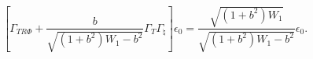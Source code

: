\begin{equation}
\label{susy2}
\left[\Gamma_{T R \Phi} + \frac{b}{\sqrt{(1 + b^2) W_1 - b^2}}
\Gamma_{T} \Gamma_{\natural} \right] \epsilon_0 = 
\frac{\sqrt{(1 + b^2) W_1}}{\sqrt{(1 + b^2) W_1 - b^2}} \epsilon_0.
\end{equation}

